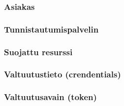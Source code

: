 
\subsubsection{Asiakas}

\subsubsection{Tunnistautumispalvelin}

\subsubsection{Suojattu resurssi}

\subsubsection{Valtuutustieto (crendentials)}

\subsubsection{Valtuutusavain (token)}
